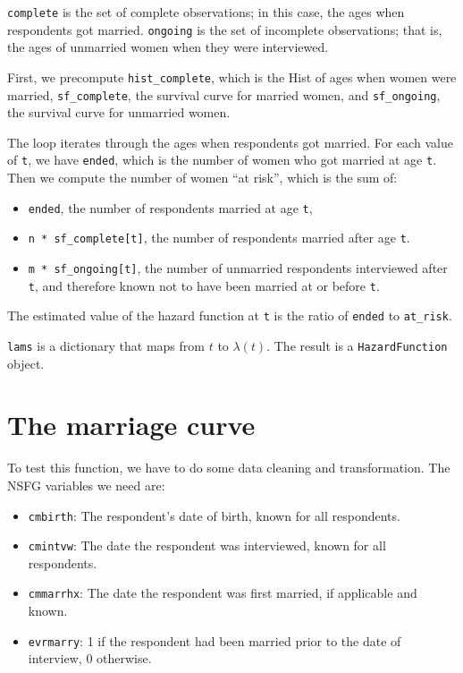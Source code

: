 \documentclass[12pt]{book}
\begin{document}
{\tt complete} is the set of complete observations; in this case,
the ages when respondents got married.  {\tt ongoing} is the set
of incomplete observations; that is, the ages of unmarried women
when they were interviewed.

First, we precompute \verb"hist_complete", which is the Hist
of ages when women were married, \verb"sf_complete", the
survival curve for married women, and \verb"sf_ongoing",
the survival curve for unmarried women.

The loop iterates through the ages when respondents got married.
For each value of {\tt t}, we have {\tt ended}, which is the number
of women who got married at age {\tt t}.  Then we compute
the number of women ``at risk'', which is the sum of:

\begin{itemize}

\item {\tt ended}, the number of respondents married at age {\tt t},

\item \verb"n * sf_complete[t]", the number of respondents
married after age {\tt t}.

\item \verb"m * sf_ongoing[t]", the number of unmarried respondents
interviewed after {\tt t}, and therefore known not to
have been married at or before {\tt t}.

\end{itemize}

The estimated value of the hazard function at {\tt t} is the ratio of
{\tt ended} to \verb"at_risk".

{\tt lams} is a dictionary that maps
from $t$ to $\lambda(t)$.  The result is a {\tt HazardFunction}
object.


\section{The marriage curve}

To test this function, we have to do some data cleaning and
transformation.  The NSFG variables we need are:

\begin{itemize}

\item {\tt cmbirth}: The respondent's date of birth, known for
all respondents.

\item {\tt cmintvw}: The date the respondent was interviewed,
known for all respondents.

\item {\tt cmmarrhx}: The date the respondent was first married,
if applicable and known.

\item {\tt evrmarry}: 1 if the respondent had been
married prior to the date of interview, 0 otherwise.

\end{itemize}
\end{document}
